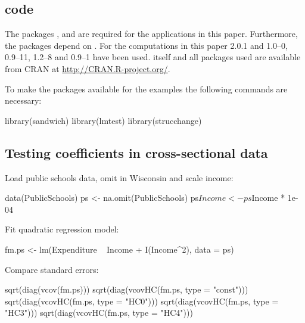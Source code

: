 \documentclass{Z}
\begin{document}
\begin{appendix}


\section[R code]{ code}

The packages ,  and  are
required for the applications in this paper. Furthermore, the packages
depend on . For the computations in this paper 
2.0.1 and 
1.0--0,
 0.9--11,
 1.2--8
and  0.9--1
have been used.  itself and all packages used are available from
CRAN at \url{http://CRAN.R-project.org/}.

To make the packages available for the examples the following commands are 
necessary:
\begin{Schunk}
\begin{Sinput}
  library(sandwich)
  library(lmtest)
  library(strucchange)
\end{Sinput}
\end{Schunk}

\subsection{Testing coefficients in cross-sectional data}

Load public schools data,
omit  in Wisconsin and scale income:
\begin{Schunk}
\begin{Sinput}
  data(PublicSchools)
  ps <- na.omit(PublicSchools)
  ps$Income <- ps$Income * 1e-04
\end{Sinput}
\end{Schunk}

Fit quadratic regression model:
\begin{Schunk}
\begin{Sinput}
  fm.ps <- lm(Expenditure ~ Income + I(Income^2), data = ps)
\end{Sinput}
\end{Schunk}

Compare standard errors:
\begin{Schunk}
\begin{Sinput}
  sqrt(diag(vcov(fm.ps)))
  sqrt(diag(vcovHC(fm.ps, type = "const")))
  sqrt(diag(vcovHC(fm.ps, type = "HC0")))
  sqrt(diag(vcovHC(fm.ps, type = "HC3")))
  sqrt(diag(vcovHC(fm.ps, type = "HC4")))
\end{Sinput}
\end{Schunk}


\end{appendix}
\end{document}

